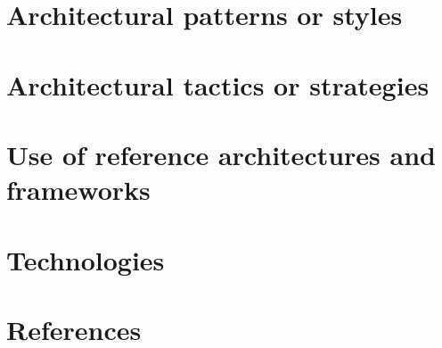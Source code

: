 \documentclass[11pt,a4paper,titlepage]{article}
\begin{document}
	

\section{Architectural patterns or styles}

	

\section{Architectural tactics or strategies}

	

\section{Use of reference architectures and frameworks}

	
	

\section {Technologies}



\pagebreak

\section{References}


\end{document}
